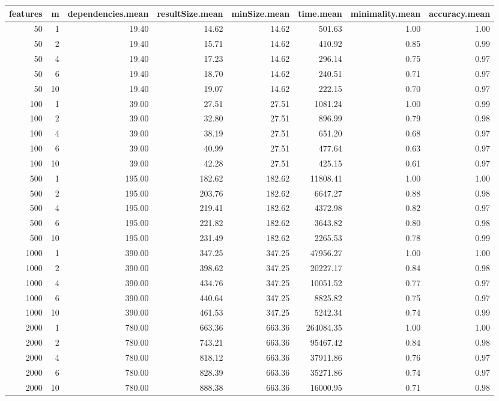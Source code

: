 \begin{table}[ht]
\centering
\begin{tabular}{rrrrrrrr}
  \hline
features & m & dependencies.mean & resultSize.mean & minSize.mean & time.mean & minimality.mean & accuracy.mean \\ 
  \hline
 50 &   1 & 19.40 & 14.62 & 14.62 & 501.63 & 1.00 & 1.00 \\ 
   50 &   2 & 19.40 & 15.71 & 14.62 & 410.92 & 0.85 & 0.99 \\ 
   50 &   4 & 19.40 & 17.23 & 14.62 & 296.14 & 0.75 & 0.97 \\ 
   50 &   6 & 19.40 & 18.70 & 14.62 & 240.51 & 0.71 & 0.97 \\ 
   50 &  10 & 19.40 & 19.07 & 14.62 & 222.15 & 0.70 & 0.97 \\ 
  100 &   1 & 39.00 & 27.51 & 27.51 & 1081.24 & 1.00 & 0.99 \\ 
  100 &   2 & 39.00 & 32.80 & 27.51 & 896.99 & 0.79 & 0.98 \\ 
  100 &   4 & 39.00 & 38.19 & 27.51 & 651.20 & 0.68 & 0.97 \\ 
  100 &   6 & 39.00 & 40.99 & 27.51 & 477.64 & 0.63 & 0.97 \\ 
  100 &  10 & 39.00 & 42.28 & 27.51 & 425.15 & 0.61 & 0.97 \\ 
  500 &   1 & 195.00 & 182.62 & 182.62 & 11808.41 & 1.00 & 1.00 \\ 
  500 &   2 & 195.00 & 203.76 & 182.62 & 6647.27 & 0.88 & 0.98 \\ 
  500 &   4 & 195.00 & 219.41 & 182.62 & 4372.98 & 0.82 & 0.97 \\ 
  500 &   6 & 195.00 & 221.82 & 182.62 & 3643.82 & 0.80 & 0.98 \\ 
  500 &  10 & 195.00 & 231.49 & 182.62 & 2265.53 & 0.78 & 0.99 \\ 
  1000 &   1 & 390.00 & 347.25 & 347.25 & 47956.27 & 1.00 & 1.00 \\ 
  1000 &   2 & 390.00 & 398.62 & 347.25 & 20227.17 & 0.84 & 0.98 \\ 
  1000 &   4 & 390.00 & 434.76 & 347.25 & 10051.52 & 0.77 & 0.97 \\ 
  1000 &   6 & 390.00 & 440.64 & 347.25 & 8825.82 & 0.75 & 0.97 \\ 
  1000 &  10 & 390.00 & 461.53 & 347.25 & 5242.34 & 0.74 & 0.99 \\ 
  2000 &   1 & 780.00 & 663.36 & 663.36 & 264084.35 & 1.00 & 1.00 \\ 
  2000 &   2 & 780.00 & 743.21 & 663.36 & 95467.42 & 0.84 & 0.98 \\ 
  2000 &   4 & 780.00 & 818.12 & 663.36 & 37911.86 & 0.76 & 0.97 \\ 
  2000 &   6 & 780.00 & 828.39 & 663.36 & 35271.86 & 0.74 & 0.97 \\ 
  2000 &  10 & 780.00 & 888.38 & 663.36 & 16000.95 & 0.71 & 0.98 \\ 
   \hline
\end{tabular}
\end{table}
